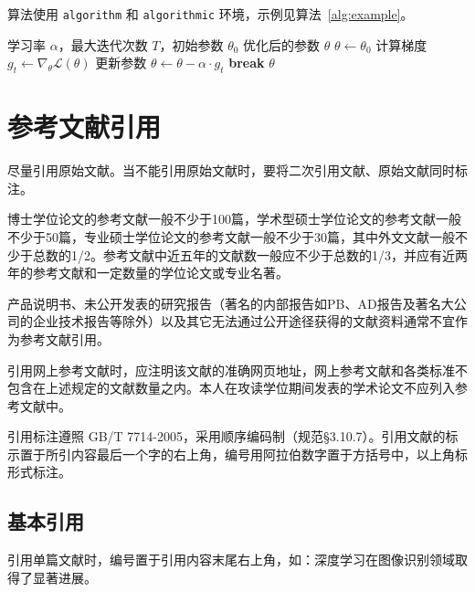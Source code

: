 算法使用 \texttt{algorithm} 和 \texttt{algorithmic} 环境，示例见算法~\ref{alg:example}。

\begin{algorithm}[htbp]
    \caption{梯度下降算法}
    \label{alg:example}
    \begin{algorithmic}[1]
        \Require 学习率 $\alpha$，最大迭代次数 $T$，初始参数 $\theta_0$
        \Ensure 优化后的参数 $\theta$
        \State $\theta \leftarrow \theta_0$
            \State 计算梯度 $g_t \leftarrow \nabla_\theta \mathcal{L}(\theta)$
            \State 更新参数 $\theta \leftarrow \theta - \alpha \cdot g_t$
                \State \textbf{break}
            \EndIf
        \EndFor
        \State \Return $\theta$
    \end{algorithmic}
\end{algorithm}

\section{参考文献引用}
\label{sec:citation}
尽量引用原始文献。当不能引用原始文献时，要将二次引用文献、原始文献同时标注。

博士学位论文的参考文献一般不少于100篇，学术型硕士学位论文的参考文献一般不少于50篇，专业硕士学位论文的参考文献一般不少于30篇，其中外文文献一般不少于总数的1/2。参考文献中近五年的文献数一般应不少于总数的1/3，并应有近两年的参考文献和一定数量的学位论文或专业名著。

产品说明书、未公开发表的研究报告（著名的内部报告如PB、AD报告及著名大公司的企业技术报告等除外）以及其它无法通过公开途径获得的文献资料通常不宜作为参考文献引用。

引用网上参考文献时，应注明该文献的准确网页地址，网上参考文献和各类标准不包含在上述规定的文献数量之内。本人在攻读学位期间发表的学术论文不应列入参考文献中。


引用标注遵照 GB/T 7714-2005，采用顺序编码制（规范§3.10.7）。引用文献的标示置于所引内容最后一个字的右上角，编号用阿拉伯数字置于方括号中，以上角标形式标注。

\subsection{基本引用}

引用单篇文献时，编号置于引用内容末尾右上角，如：深度学习在图像识别领域取得了显著进展\cite{ref1}。

